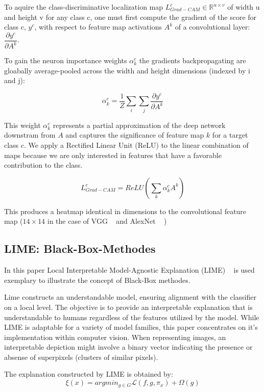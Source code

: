 \documentclass{article}
\begin{document}
To aquire the class-discriminative localization map \( L_{Grad-CAM}^{c} \in \mathds{R}^{ u \times v} \) of width u and height v for any class c, one must first compute the gradient of the score for class c, \(y^c\), with respect to feature map activations \(A^k\) of a convolutional layer: \( \dfrac{ \partial y^c}{ \partial A^k} \). 

To gain the neuron importance weights \(\alpha^c_k\) the gradients backpropagating are gloabally average-pooled across the width and height dimensions (indexed by i and j): 

\[ \alpha^c_k = \dfrac{1}{Z}\sum_{i} \sum_{j} \dfrac{\partial y^c}{\partial A^k}  \]

This weight $\alpha^c_k$ represents a partial approximation of the deep network downstram from $A$ and captures the significance of feature map $k$ for a target class $c$. We apply a Rectified Linear Unit (ReLU) to the linear combination of maps because we are only interested in features that have a favorable contribution to the class. 

\[ L_{Grad-CAM}^{c} = ReLU ( \sum_{k} \alpha^c_k A^k ) \]

This produces a heatmap identical in dimensions to the convolutional feature map ($14 \times 14$ in the case of VGG ~\cite{simonyan2015deep} and AlexNet ~\cite{krizhevsky2012} )









\subsection{LIME: Black-Box-Methodes}
In this paper Local Interpretable Model-Agnostic Explanation (LIME) ~\cite{ribeiro2016why} is used exemplary to illustrate the concept of Black-Box methodes.

Lime constructs an understandable model, ensuring alignment with the classifier on a local level. The objective is to provide an interpretable explanation that is understandable to humans regardless of the features utilized by the model. 
While LIME is adaptable for a variety of model families, this paper concentrates on it's implementation within computer vision. 
When representing images, an interpretable depiction might involve a binary vector indicating the presence or absense of superpixels (clusters of similar pixels).

The explanation constructed by LIME is obtained by:
\[\xi(x) = argmin_{g \in G} \mathcal{L}
(f, g, \pi_x) + \Omega(g) \]
\end{document}
